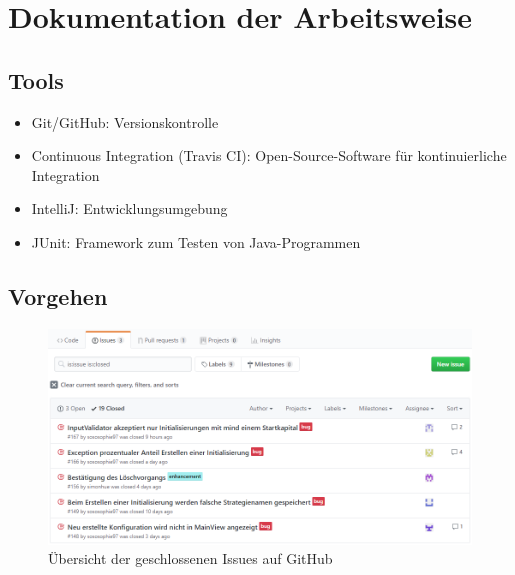 \section{Dokumentation der Arbeitsweise}

\subsection{Tools}

\begin{itemize}
\item Git/GitHub: Versionskontrolle
\item Continuous Integration (Travis CI): Open-Source-Software für kontinuierliche
Integration
\item IntelliJ: Entwicklungsumgebung
\item JUnit: Framework zum Testen von Java-Programmen
\end{itemize}

\subsection{Vorgehen}

\begin{figure}[H]
	\includegraphics[width=1.1\textwidth]{qs_1.png}
	\caption{Übersicht der geschlossenen Issues auf GitHub}
\end{figure}